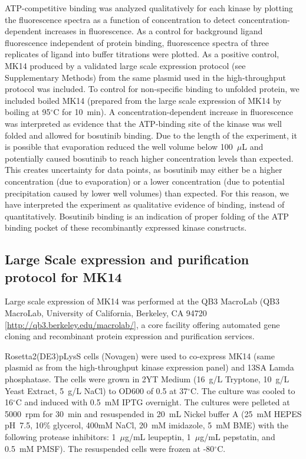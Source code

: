 \documentclass[phd,tocprelim]{cornell}
\begin{document}
ATP-competitive binding was analyzed qualitatively for each kinase by plotting the fluorescence spectra as a function of concentration to detect concentration-dependent increases in fluorescence. 
As a control for background ligand fluorescence independent of protein binding, fluorescence spectra of three replicates of ligand into buffer titrations were plotted. 
As a positive control, MK14 produced by a validated large scale expression protocol (see Supplementary Methods) from the same plasmid used in the high-throughput protocol was included. To control for non-specific binding to unfolded protein, we included boiled MK14 (prepared from the large scale expression of MK14 by boiling at 95$^{\circ}$C for 10~min). 
A concentration-dependent increase in fluorescence was interpreted as evidence that the ATP-binding site of the kinase was well folded and allowed for bosutinib binding. Due to the length of the experiment, it is possible that evaporation reduced the well volume below 100~$\mu$L and potentially caused bosutinib to reach higher concentration levels than expected. This creates uncertainty for data points, as bosutinib may either be a higher concentration (due to evaporation) or a lower concentration (due to potential precipitation caused by lower well volumes) than expected. 
For this reason, we have interpreted the experiment as qualitative evidence of binding, instead of quantitatively. 
Bosutinib binding is an indication of proper folding of the ATP binding pocket of these recombinantly expressed kinase constructs. 

\subsection{Large Scale expression and purification protocol for MK14}


Large scale expression of MK14 was performed  at the QB3 MacroLab (QB3 MacroLab, University of California, Berkeley, CA 94720 [\url{http://qb3.berkeley.edu/macrolab/}], a core facility offering automated gene cloning and recombinant protein expression and purification services.

Rosetta2(DE3)pLysS cells (Novagen) were used to co-express MK14 (same plasmid as from the high-throughput kinase expression panel) and 13SA Lamda phosphatase. The cells were grown in 2YT Medium (16~g/L Tryptone, 10~g/L Yeast Extract, 5~g/L NaCl) to OD600 of 0.5 at 37$^{\circ}$C. The culture was cooled to 16$^{\circ}$C and induced with 0.5~mM IPTG overnight. The cultures were pelleted at 5000~rpm for 30~min and resuspended in 20~mL Nickel buffer A (25~mM HEPES pH~7.5, 10\% glycerol, 400mM NaCl, 20~mM imidazole, 5~mM BME) with the following protease inhibitors: 1~$\mu$g/mL leupeptin, 1~$\mu$g/mL pepstatin, and 0.5~mM PMSF). The resuspended cells were frozen at -80$^{\circ}$C. 
\end{document}
